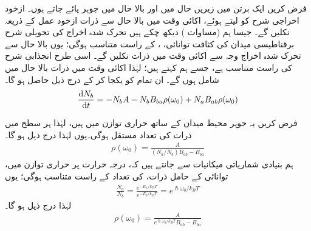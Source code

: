 
فرض کریں ایک برتن میں زیریں حال  میں  اور بالا حال  میں  جوہر پائے جاتے ہوں۔ ازخود اخراجی شرح کو  لیتے ہوئے، اکائی وقت میں بالا حال سے  ذرات ازخود عمل کے ذریعہ نکلیں گے۔ جیسا ہم (مساوات ) دیکھ چکے ہیں تحرک شدہ اخراج کی تحویلی شرح برقناطیسی میدان کی کثافت توانائی، ، کے راست متناسب ہوگی؛ یوں بالا حال سے تحرک شدہ اخراج وجہ سے اکائی وقت میں  ذرات نکلیں گے۔ اسی طرح انجذابی شرح  کی راست متناسب ہے، جسے ہم  کہتے ہیں؛ لہٰذا اکائی وقت میں  ذرات بالا حال میں شامل ہوں گے۔ ان تمام کو یکجا کر کے درج ذیل حاصل ہو گا۔
\begin{align}
	\frac{\dif N_b}{\dif t} = -N_bA-N_bB_{ba}\rho(\omega_0)+N_aB_{ab}\rho(\omega_0)
\end{align}

فرض کریں یہ جوہر محیط میدان کے ساتھ حراری توازن میں ہیں، لہٰذا ہر سطح میں ذرات کی تعداد مستقل ہوگی۔یوں  لہٰذا درج ذیل ہو گا۔
\begin{align}
	\rho(\omega_0) = \frac{A}{(N_a/N_b)B_{ab}-B_{ba}}
\end{align}
ہم بنیادی شماریاتی میکانیات سے جانتے ہیں کہ، درجہ حرارت  پر حراری توازن میں، توانائی  کے حامل ذرات، کی تعداد   کے راست متناسب ہوگی؛ یوں
\begin{align}
	\frac{N_a}{N_b} = \frac{e^{-E_a/k_{B}T}}{e^{-E_b/k_BT}} = e^{\hslash\omega_0/k_BT}
\end{align}
لہٰذا درج ذیل ہو گا۔
\begin{align}
	\rho(\omega_0) = \frac{A}{e^{\hslash\omega_0/k_BT}B_{ab}-B_{ba}}
\end{align}


